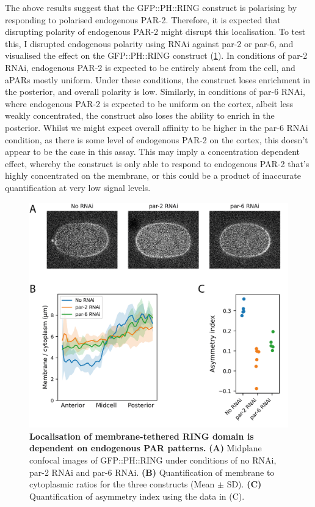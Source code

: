 \documentclass[12pt]{"article"}
\newcommand{\mycaption}[2]{\caption[#1]{\textbf{#1.} #2}}
\begin{document}
The above results suggest that the GFP::PH::RING construct is polarising by responding to polarised endogenous PAR-2. Therefore, it is expected that disrupting polarity of endogenous PAR-2 might disrupt this localisation. To test this, I disrupted endogenous polarity using RNAi against par-2 or par-6, and visualised the effect on the GFP::PH::RING construct (\cref{fig:ph_ring_rnai}). In conditions of par-2 RNAi, endogenous PAR-2 is expected to be entirely absent from the cell, and aPARs mostly uniform. Under these conditions, the construct loses enrichment in the posterior, and overall polarity is low. Similarly, in conditions of par-6 RNAi, where endogenous PAR-2 is expected to be uniform on the cortex, albeit less weakly concentrated, the construct also loses the ability to enrich in the posterior. Whilst we might expect overall affinity to be higher in the par-6 RNAi condition, as there is some level of endogenous PAR-2 on the cortex, this doesn't appear to be the case in this assay. This may imply a concentration dependent effect, whereby the construct is only able to respond to endogenous PAR-2 that's highly concentrated on the membrane, or this could be a product of inaccurate quantification at very low signal levels.\\

\begin{figure}
\includegraphics[scale=1]{ph_ring_rnai}
\centering
\mycaption{Localisation of membrane-tethered RING domain is dependent on endogenous PAR patterns}{
\textbf{(A)} Midplane confocal images of GFP::PH::RING under conditions of no RNAi, par-2 RNAi and par-6 RNAi.
\textbf{(B)} Quantification of membrane to cytoplasmic ratios for the three constructs (Mean $\pm$ SD).
\textbf{(C)} Quantification of asymmetry index using the data in (C).
}
\label{fig:ph_ring_rnai}
\end{figure}
\end{document}
